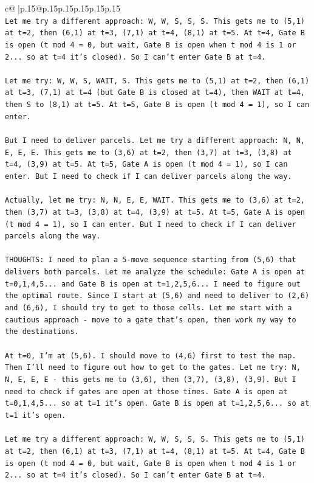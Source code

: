 \documentclass{article}
\begin{document}
{\begin{supertabular}{c@{$\;$}|p{.15\linewidth}@{}p{.15\linewidth}p{.15\linewidth}p{.15\linewidth}p{.15\linewidth}p{.15\linewidth}}
{{{\\ 
\texttt{Let me try a different approach: W, W, S, S, S. This gets me to (5,1) at t=2, then (6,1) at t=3, (7,1) at t=4, (8,1) at t=5. At t=4, Gate B is open (t mod 4 = 0, but wait, Gate B is open when t mod 4 is 1 or 2... so at t=4 it's closed). So I can't enter Gate B at t=4.} \\
\\ 
\texttt{Let me try: W, W, S, WAIT, S. This gets me to (5,1) at t=2, then (6,1) at t=3, (7,1) at t=4 (but Gate B is closed at t=4), then WAIT at t=4, then S to (8,1) at t=5. At t=5, Gate B is open (t mod 4 = 1), so I can enter.} \\
\\ 
\texttt{But I need to deliver parcels. Let me try a different approach: N, N, E, E, E. This gets me to (3,6) at t=2, then (3,7) at t=3, (3,8) at t=4, (3,9) at t=5. At t=5, Gate A is open (t mod 4 = 1), so I can enter. But I need to check if I can deliver parcels along the way.} \\
\\ 
\texttt{Actually, let me try: N, N, E, E, WAIT. This gets me to (3,6) at t=2, then (3,7) at t=3, (3,8) at t=4, (3,9) at t=5. At t=5, Gate A is open (t mod 4 = 1), so I can enter. But I need to check if I can deliver parcels along the way.} \\
\\ 
\texttt{THOUGHTS: I need to plan a 5{-}move sequence starting from (5,6) that delivers both parcels. Let me analyze the schedule: Gate A is open at t=0,1,4,5... and Gate B is open at t=1,2,5,6... I need to figure out the optimal route. Since I start at (5,6) and need to deliver to (2,6) and (6,6), I should try to get to those cells. Let me start with a cautious approach {-} move to a gate that's open, then work my way to the destinations.} \\
\\ 
\texttt{At t=0, I'm at (5,6). I should move to (4,6) first to test the map. Then I'll need to figure out how to get to the gates. Let me try: N, N, E, E, E {-} this gets me to (3,6), then (3,7), (3,8), (3,9). But I need to check if gates are open at those times. Gate A is open at t=0,1,4,5... so at t=1 it's open. Gate B is open at t=1,2,5,6... so at t=1 it's open.} \\
\\ 
\texttt{Let me try a different approach: W, W, S, S, S. This gets me to (5,1) at t=2, then (6,1) at t=3, (7,1) at t=4, (8,1) at t=5. At t=4, Gate B is open (t mod 4 = 0, but wait, Gate B is open when t mod 4 is 1 or 2... so at t=4 it's closed). So I can't enter Gate B at t=4.} \\
}}}
\end{supertabular}}
\end{document}
